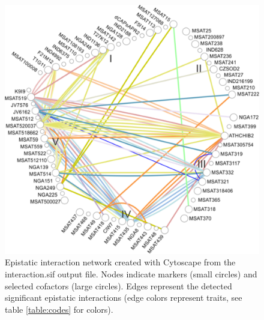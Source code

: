\begin{figure}[h!]
  \centering
  \includegraphics[keepaspectratio,scale=0.30]{eps/image_3_1_6.eps}
  \caption[Epistatic interaction network.]{Epistatic interaction network created with Cytoscape from the 
          interaction.sif output file. Nodes indicate markers (small circles) and selected cofactors (large 
          circles). Edges represent the detected significant epistatic interactions (edge colors represent 
          traits, see table \ref{table:codes} for colors).}
          \label{fig:epistaticinteractions}
\end{figure}

